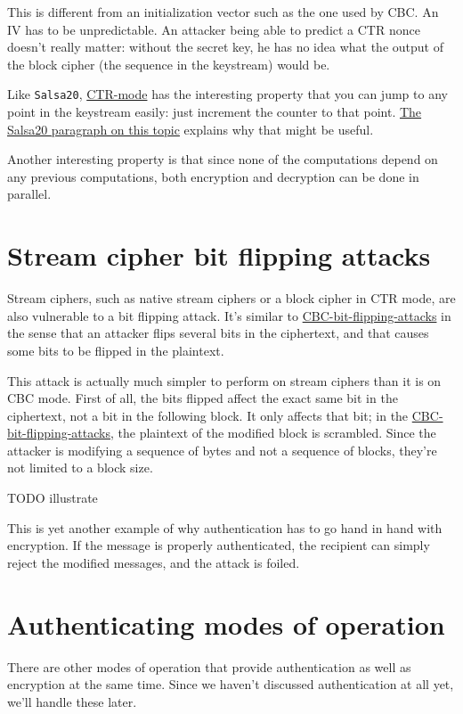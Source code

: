 \documentclass[11pt,ebook,table,dvipsnames]{memoir}
\begin{document}
This is different from an \gls{initialization vector} such as the one
used by CBC. An \gls{IV} has to be unpredictable. An attacker being
able to predict a CTR \gls{nonce} doesn't really matter: without the
secret key, he has no idea what the output of the block cipher (the
sequence in the keystream) would be.

Like \texttt{Salsa20}, \hyperref[CTR mode]{CTR-mode} has the interesting property that you can jump
to any point in the keystream easily: just increment the counter to
that point. \hyperref[keystream-jump]{The Salsa20 paragraph on this topic} explains why that
might be useful.

Another interesting property is that since none of the computations
depend on any previous computations, both encryption and decryption
can be done in parallel.
\section{Stream cipher bit flipping attacks}
\label{sec-2-3-15}

Stream ciphers, such as native stream ciphers or a block cipher in
\gls{CTR mode}, are also vulnerable to a bit flipping attack. It's
similar to \hyperref[CBC bit flipping attacks]{CBC-bit-flipping-attacks} in the sense that an attacker
flips several bits in the ciphertext, and that causes some bits to be
flipped in the plaintext.

This attack is actually much simpler to perform on stream ciphers than
it is on \gls{CBC mode}. First of all, the bits flipped affect the
exact same bit in the ciphertext, not a bit in the following block. It
only affects that bit; in the \hyperref[CBC bit flipping attacks]{CBC-bit-flipping-attacks}, the plaintext
of the modified block is scrambled. Since the attacker is modifying a
sequence of bytes and not a sequence of blocks, they're not limited to
a block size.

TODO illustrate

This is yet another example of why authentication has to go hand in
hand with encryption. If the message is properly authenticated, the
recipient can simply reject the modified messages, and the attack is
foiled.
\section{Authenticating modes of operation}
\label{sec-2-3-16}

There are other modes of operation that provide authentication as
well as encryption at the same time. Since we haven't discussed
authentication at all yet, we'll handle these later.
\end{document}
